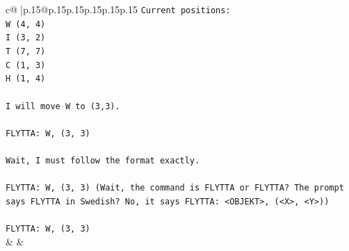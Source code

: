 \documentclass{article}
\begin{document}
{\begin{supertabular}{c@{$\;$}|p{.15\linewidth}@{}p{.15\linewidth}p{.15\linewidth}p{.15\linewidth}p{.15\linewidth}p{.15\linewidth}}
{{{\texttt{Current positions:} \\
\texttt{W (4, 4)} \\
\texttt{I (3, 2)} \\
\texttt{T (7, 7)} \\
\texttt{C (1, 3)} \\
\texttt{H (1, 4)} \\
\\ 
\texttt{I will move W to (3,3).} \\
\\ 
\texttt{FLYTTA: W, (3, 3)} \\
\\ 
\texttt{Wait, I must follow the format exactly.} \\
\\ 
\texttt{FLYTTA: W, (3, 3) (Wait, the command is FLYTTA or FLYTTA? The prompt says FLYTTA in Swedish? No, it says FLYTTA: <OBJEKT>, (<X>, <Y>))} \\
\\ 
\texttt{FLYTTA: W, (3, 3)} \\
            }
        }
    }
    & & \\ \\


\end{supertabular}}
\end{document}
